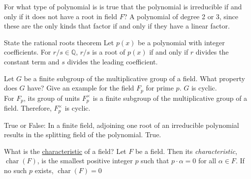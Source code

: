 \documentclass[avery5371,grid]{flashcards}
\newcommand{\Q}{\mathbb{Q}}
\DeclareMathOperator{\ch}{char}
\begin{document}
\begin{flashcard}[Fields]{For what type of polynomial is is true that the polynomial is irreducible if and only if it does not have a root in field $F$?}
 A polynomial of degree 2 or 3, since these are the only kinds that factor if and only if they have a linear factor.
\end{flashcard}

\begin{flashcard}[Fields]{State the rational roots theorem}
 Let $p(x)$ be a polynomial with integer coefficients. For $r/s \in \Q$, $r/s$ is a root of $p(x)$ if and only if $r$ divides the constant term  and $s$ divides the leading coefficient.
\end{flashcard}

\begin{flashcard}[Fields]{Let $G$ be a finite subgroup of the multiplicative group of a field. What property does $G$ have? Give an example for the field $F_p$ for prime $p$.}
 $G$ is cyclic.\\
 
 For $F_p$, its group of units $F_p^\times$ is a finite subgroup of the multiplicative group of a field. Therefore, $F_p^\times$ is cyclic.
\end{flashcard}

\begin{flashcard}[Fields]{True or False: In a finite field, adjoining one root of an irreducible polynomial results in the splitting field of the polynomial.}
 True.
\end{flashcard}

\begin{flashcard}[Fields]{What is the \underline{characteristic} of a field?}
 Let $F$ be a field. Then its \emph{characteristic}, $\ch(F)$, is the smallest positive integer $p$ such that $p \cdot \alpha = 0$ for all $\alpha\in F$. If no such $p$ exists, $\ch(F) = 0$
\end{flashcard}
\end{document}
